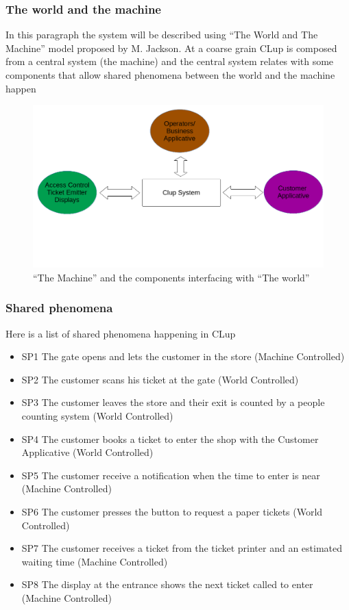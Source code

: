 \subsubsection{The world and the machine}
In this paragraph the system will be described using ``The World and The Machine'' model proposed by M. Jackson.
At a coarse grain CLup is composed from a central system (the machine) and the central system relates with some components that allow shared phenomena between the world and the machine happen
\begin{figure}
    \centering
    \includegraphics[width=\textwidth]{Images/system.png}
    \caption{\label{fig:Coarse_Grain_System}``The Machine'' and the components interfacing with ``The world''}
\end{figure}

\subsubsection{Shared phenomena}
Here is a list of shared phenomena happening in CLup
\begin{itemize}[label={}]
    \item SP1 The gate opens and lets the customer in the store (Machine Controlled)
    \item SP2 The customer scans his ticket at the gate (World Controlled)
    \item SP3 The customer leaves the store and their exit is counted by a people counting system (World Controlled)
    \item SP4 The customer books a ticket to enter the shop with the Customer Applicative (World Controlled)
    \item SP5 The customer receive a notification when the time to enter is near (Machine Controlled)
    \item SP6 The customer presses the button to request a paper tickets (World Controlled)
    \item SP7 The customer receives a ticket from the ticket printer and an estimated waiting time (Machine Controlled)
    \item SP8 The display at the entrance shows the next ticket called to enter (Machine Controlled)
\end{itemize}

